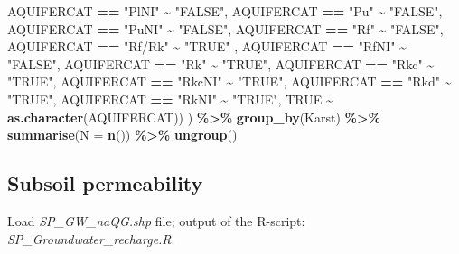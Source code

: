 \documentclass[
  12pt,
]{article}
\newenvironment{Shaded}{\begin{snugshade}}{\end{snugshade}}
\newcommand{\DataTypeTok}[1]{\textcolor[rgb]{0.13,0.29,0.53}{#1}}
\newcommand{\KeywordTok}[1]{\textcolor[rgb]{0.13,0.29,0.53}{\textbf{#1}}}
\newcommand{\NormalTok}[1]{#1}
\newcommand{\OperatorTok}[1]{\textcolor[rgb]{0.81,0.36,0.00}{\textbf{#1}}}
\newcommand{\OtherTok}[1]{\textcolor[rgb]{0.56,0.35,0.01}{#1}}
\newcommand{\StringTok}[1]{\textcolor[rgb]{0.31,0.60,0.02}{#1}}
\begin{document}
\begin{Shaded}
\begin{Highlighting}[]
\NormalTok{      AQUIFERCAT }\OperatorTok{==}\StringTok{ "PlNI"}   \OperatorTok{\textasciitilde{}}\StringTok{ "FALSE"}\NormalTok{,     }
\NormalTok{      AQUIFERCAT }\OperatorTok{==}\StringTok{ "Pu"}     \OperatorTok{\textasciitilde{}}\StringTok{ "FALSE"}\NormalTok{,    }
\NormalTok{      AQUIFERCAT }\OperatorTok{==}\StringTok{ "PuNI"}   \OperatorTok{\textasciitilde{}}\StringTok{ "FALSE"}\NormalTok{,   }
\NormalTok{      AQUIFERCAT }\OperatorTok{==}\StringTok{ "Rf"}     \OperatorTok{\textasciitilde{}}\StringTok{ "FALSE"}\NormalTok{,  }
\NormalTok{      AQUIFERCAT }\OperatorTok{==}\StringTok{ "Rf/Rk"}  \OperatorTok{\textasciitilde{}}\StringTok{ "TRUE"}\NormalTok{ , }
\NormalTok{      AQUIFERCAT }\OperatorTok{==}\StringTok{ "RfNI"}   \OperatorTok{\textasciitilde{}}\StringTok{ "FALSE"}\NormalTok{,}
\NormalTok{      AQUIFERCAT }\OperatorTok{==}\StringTok{ "Rk"}     \OperatorTok{\textasciitilde{}}\StringTok{ "TRUE"}\NormalTok{,}
\NormalTok{      AQUIFERCAT }\OperatorTok{==}\StringTok{ "Rkc"}    \OperatorTok{\textasciitilde{}}\StringTok{ "TRUE"}\NormalTok{,}
\NormalTok{      AQUIFERCAT }\OperatorTok{==}\StringTok{ "RkcNI"}  \OperatorTok{\textasciitilde{}}\StringTok{ "TRUE"}\NormalTok{,}
\NormalTok{      AQUIFERCAT }\OperatorTok{==}\StringTok{ "Rkd"}    \OperatorTok{\textasciitilde{}}\StringTok{ "TRUE"}\NormalTok{,}
\NormalTok{      AQUIFERCAT }\OperatorTok{==}\StringTok{ "RkNI"}   \OperatorTok{\textasciitilde{}}\StringTok{ "TRUE"}\NormalTok{,}
      \OtherTok{TRUE} \OperatorTok{\textasciitilde{}}\StringTok{ }\KeywordTok{as.character}\NormalTok{(AQUIFERCAT))}
\NormalTok{    ) }\OperatorTok{\%\textgreater{}\%}
\StringTok{    }\KeywordTok{group\_by}\NormalTok{(Karst) }\OperatorTok{\%\textgreater{}\%}
\StringTok{    }\KeywordTok{summarise}\NormalTok{(}\DataTypeTok{N =} \KeywordTok{n}\NormalTok{()) }\OperatorTok{\%\textgreater{}\%}
\StringTok{    }\KeywordTok{ungroup}\NormalTok{()}
\end{Highlighting}
\end{Shaded}

\hypertarget{subsoil-permeability}{%
\subsection{Subsoil permeability}\label{subsoil-permeability}}

Load \emph{SP\_GW\_naQG.shp} file; output of the R-script:
\emph{SP\_Groundwater\_recharge.R}.
\end{document}
